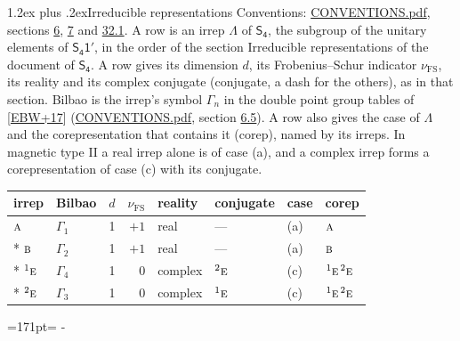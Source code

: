 \documentclass[10pt,a4paper]{article}
\makeatletter
\renewcommand\section{\@startsection{section}{1}{\z@}{-3ex plus -1ex minus -.2ex}%
  {1.2ex plus .2ex}{\normalfont\large\sffamily\bfseries\color{parttitle}}}
\newcommand{\needspace}[1]{\par\penalty-100\begingroup\dimen0=#1\relax\dimen2=\pagegoal
  \advance\dimen2-\pagetotal\ifdim\dimen0>\dimen2\relax\ifdim\dimen2>0pt\vfil\break\fi\fi
  \endgroup}
\numberwithin{equation}{section}
\newcommand{\grp}[1]{\mathsf{#1}}
\newcommand{\irr}[1]{\text{\normalfont\scshape #1}}
\newcommand{\conjpair}[1]{{}^{#1}}
\newcommand{\fsind}{\nu_{\mathrm{FS}}}
\makeatother
\begin{document}
\section{Irreducible representations}\label{s:irreps}
Conventions: \href{../../CONVENTIONS.pdf}{CONVENTIONS.pdf}, sections \href{../../../rotation/CONVENTIONS.pdf\#conv.6}{6}, \href{../../../rotation/CONVENTIONS.pdf\#conv.7}{7} and \href{../../CONVENTIONS.pdf\#conv.32.1}{32.1}.
\leavevmode\label{n:irrep.Delta}A row is an irrep $\Lambda$ of $\grp{S_{4}}$, the subgroup of the unitary elements of $\grp{S_{4}1'}$, in the order of the section Irreducible representations of the document of \href{../../../rotation/data/pdf/S4.pdf}{$\grp{S_{4}}$}. \label{n:index.dimension}\label{n:index.frobenius}\label{n:head.irrep}\label{n:head.reality}\label{n:head.conjugate}A row gives its dimension $d$, its Frobenius--Schur indicator $\fsind$, its reality and its complex conjugate (conjugate, a dash for the others), as in that section. \label{n:head.bilbao}\label{n:irrep.alias.gamma}Bilbao is the irrep's symbol $\Gamma_n$ in the double point group tables of [\href{../../../REFERENCES.pdf\#ref.EBW+17}{EBW+17}] (\href{../../CONVENTIONS.pdf}{CONVENTIONS.pdf}, section \href{../../../rotation/CONVENTIONS.pdf\#conv.6.5}{6.5}). \label{n:head.case.corep}\label{n:head.corep}A row also gives the case of $\Lambda$ and the corepresentation that contains it (corep), named by its irreps. In magnetic type II a real irrep alone is of case (a), and a complex irrep forms a corepresentation of case (c) with its conjugate.
\setlength{\emergencystretch}{2em}\par\setlength{\emergencystretch}{0pt}
{\small\renewcommand{\arraystretch}{1.25}\setlength{\tabcolsep}{4pt}\begin{longtable}{@{}llrrllll@{}}\toprule
irrep & Bilbao & $d$ & $\fsind$ & reality & conjugate & case & corep\\\midrule\endhead
\bottomrule\endfoot\endlastfoot
$\irr{a}$ & $\Gamma_{1}$ & 1 & $+1$ & real & --- & (a) & $\irr{a}$\\*
$\irr{b}$ & $\Gamma_{2}$ & 1 & $+1$ & real & --- & (a) & $\irr{b}$\\*
$\conjpair{1}\irr{e}$ & $\Gamma_{4}$ & 1 & $0$ & complex & $\conjpair{2}\irr{e}$ & (c) & $\conjpair{1}\irr{e}\,\conjpair{2}\irr{e}$\\*
$\conjpair{2}\irr{e}$ & $\Gamma_{3}$ & 1 & $0$ & complex & $\conjpair{1}\irr{e}$ & (c) & $\conjpair{1}\irr{e}\,\conjpair{2}\irr{e}$\\
\bottomrule\end{longtable}}
\needspace{171pt}
\end{document}
